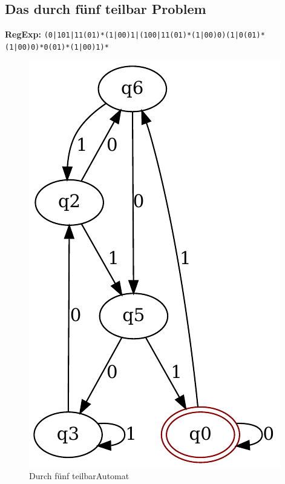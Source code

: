 \subsection{Das durch fünf teilbar Problem}
\textbf{RegExp:} \lstinline$(0|101|11(01)*(1|00)1|(100|11(01)*(1|00)0)(1|0(01)*(1|00)0)*0(01)*(1|00)1)*$
\begin{figure}[H]
  \centering
  \includegraphics{images/div5_automat.pdf}
  \caption[\flqq Durch fünf teilbar\frqq Automat]{\flqq Durch fünf teilbar\frqq Automat}
  \label{fig:div5_automat}
\end{figure}
